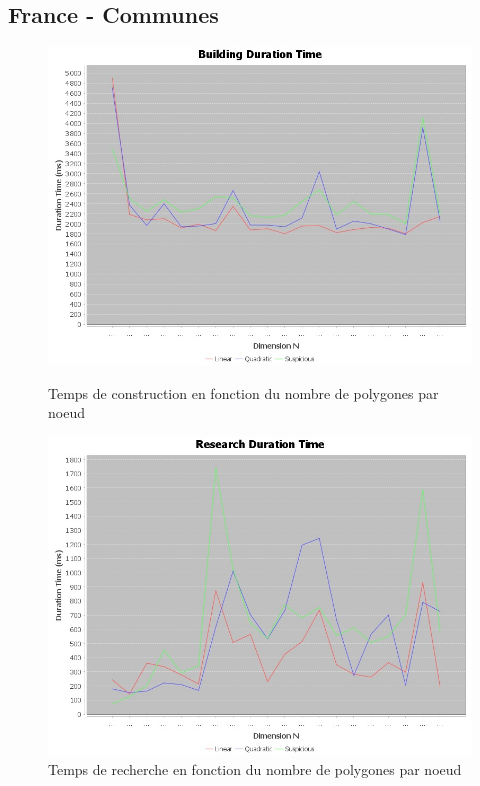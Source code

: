 \documentclass {article}
\begin{document}

\newpage
\subsection {France - Communes}\label{france}

\begin{figure}[h]
    \begin{minipage}[t]{0.46\textwidth}
	\centering
	\includegraphics[width=\textwidth]{building_graph_france.png}
	\caption{Temps de construction en fonction du nombre de polygones par noeud}
	\label{fig:belgique_stat_find_lin}
    \end{minipage}
    \begin{minipage}[t]{0.46\textwidth}
	\centering
	\includegraphics[width=\textwidth]{research_graph_france.png}
	\caption{Temps de recherche en fonction du nombre de polygones par noeud}
	\label{fig:belgique_stat_find_quad}
    \end{minipage}
\end{figure}
\end{document}
